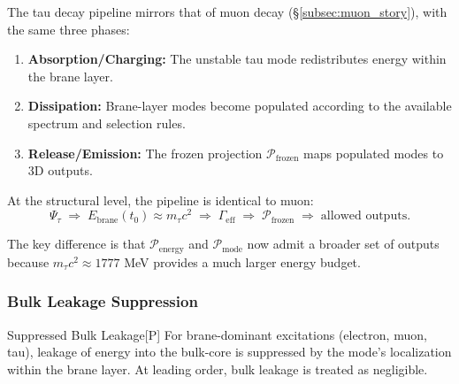 The tau decay pipeline mirrors that of muon decay (\S\ref{subsec:muon_story}), with
the same three phases:

\begin{tcolorbox}[edcPPN, title=\textbf{Physical Process Narrative: Tau Leptonic Decay}]
\begin{enumerate}[nosep]
    \item[\textbf{(i)}] \textbf{Absorption/Charging:} The unstable tau mode
          redistributes energy within the brane layer.
    \item[\textbf{(ii)}] \textbf{Dissipation:} Brane-layer modes become
          populated according to the available spectrum and selection rules.
    \item[\textbf{(iii)}] \textbf{Release/Emission:} The frozen projection
          $\mathcal{P}_{\mathrm{frozen}}$ maps populated modes to 3D outputs.
\end{enumerate}
\end{tcolorbox}

At the structural level, the pipeline is identical to muon:
\begin{equation}
\Psi_\tau \;\Rightarrow\; E_{\mathrm{brane}}(t_0)\approx m_\tau c^2 \;\Rightarrow\;
\Gamma_{\mathrm{eff}} \;\Rightarrow\; \mathcal{P}_{\mathrm{frozen}} \;\Rightarrow\; \text{allowed outputs}.
\label{eq:tau_pipeline}
\end{equation}

The key difference is that $\mathcal{P}_{\mathrm{energy}}$ and $\mathcal{P}_{\mathrm{mode}}$ now admit a
broader set of outputs because $m_\tau c^2 \approx 1777$ MeV \tagBL{} provides a much larger energy budget.


\subsubsection{Bulk Leakage Suppression}

\begin{edcPostulateBox}{Suppressed Bulk Leakage}{[P]}
For brane-dominant excitations (electron, muon, tau), leakage of energy
into the bulk-core is suppressed by the mode's localization within the
brane layer. At leading order, bulk leakage is treated as negligible.
\end{edcPostulateBox}

